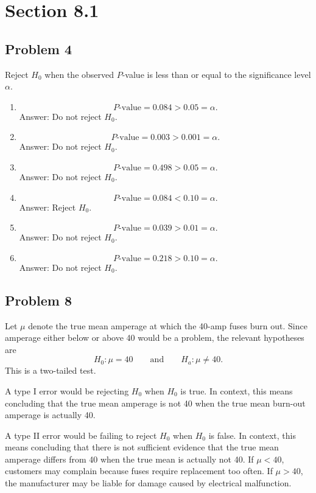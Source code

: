 \documentclass[11pt]{article}
\begin{document}
\section*{Section 8.1}

\subsection*{Problem 4}

Reject $H_0$ when the observed $P$-value is less than or equal to the significance level $\alpha$.

\begin{enumerate}
\item[(a)]
\[
P\text{-value}=0.084>0.05=\alpha.
\]
Answer: Do not reject $H_0$.

\item[(b)]
\[
P\text{-value}=0.003>0.001=\alpha.
\]
Answer: Do not reject $H_0$.

\item[(c)]
\[
P\text{-value}=0.498>0.05=\alpha.
\]
Answer: Do not reject $H_0$.

\item[(d)]
\[
P\text{-value}=0.084<0.10=\alpha.
\]
Answer: Reject $H_0$.

\item[(e)]
\[
P\text{-value}=0.039>0.01=\alpha.
\]
Answer: Do not reject $H_0$.

\item[(f)]
\[
P\text{-value}=0.218>0.10=\alpha.
\]
Answer: Do not reject $H_0$.
\end{enumerate}

\subsection*{Problem 8}

Let $\mu$ denote the true mean amperage at which the 40-amp fuses burn out. Since amperage either below or above 40 would be a problem, the relevant hypotheses are
\[
H_0:\mu=40
\qquad \text{and} \qquad
H_a:\mu\neq 40.
\]
This is a two-tailed test.

A type I error would be rejecting $H_0$ when $H_0$ is true. In context, this means concluding that the true mean amperage is not 40 when the true mean burn-out amperage is actually 40.

A type II error would be failing to reject $H_0$ when $H_0$ is false. In context, this means concluding that there is not sufficient evidence that the true mean amperage differs from 40 when the true mean is actually not 40. If $\mu<40$, customers may complain because fuses require replacement too often. If $\mu>40$, the manufacturer may be liable for damage caused by electrical malfunction.
\end{document}
